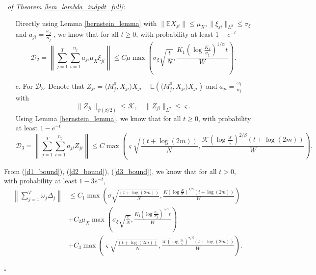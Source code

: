 \documentclass[12pt]{article}
\newenvironment{pf}{{\noindent\it Proof}\ }{\hfill $\square$\par}
\begin{document}
\begin{pf}{\it of Theorem \ref{lem_lambda_indpdt_full}:}
\begin{itemize}
  Directly using Lemma \ref{bernstein_lemma} with $\|\mathbb{E} X_{ji}\| \le  \mu_X,  \|\xi_{ji}\|_{L^2} \le \sigma_\xi$ and $a_{ji} = \frac{\omega_j}{n_j}$ , we know that for all $t\ge 0$, with probability at least $1-e^{-t}$
  \begin{equation}
  \label{d2_bound}
  \mathcal{D}_2 = \left\|\sum_{j=1}^T\sum_{i=1}^{n_j}a_{ji}\mu_X \xi_{ji}\right\| \le C \mu \max\left(\sigma_\xi \sqrt{\frac{t}{N}},\frac{K_1 (\log \frac{K_1}{\sigma_\xi})^{1/\alpha}t}{W}
  \right).
  \end{equation}
  \item[c.] For $\mathcal{D}_3$.
  Denote that $Z_{ji} = \langle M_j^0, X_{ji}\rangle X_{ji} - \mathbb{E}(\langle M^0_j, X_{ji}\rangle X_{ji})$ and $a_{ji} = \frac{\omega_j}{n_j}$ with 
  \begin{equation*}
 \|Z_{ji}\|_{\psi(\beta/2)} \le   \mathcal{K}, \quad \|Z_{ji}\|_{L^2} \le\varsigma .
  \end{equation*}
  Using Lemma \ref{bernstein_lemma}, we know that for all $t\ge0$, with probability at least $1-e^{-t}$
  \begin{equation}
  \label{d3_bound}
  \mathcal{D}_3 = \left\|\sum_{j=1}^T \sum_{i=1}^{n_j} a_{ji} Z_{ji}\right\| \le C\max\left(\varsigma \sqrt{\frac{(t+\log(2m))}{N}},\frac{\mathcal{K}\left(\log \frac{\mathcal{K}}{\varsigma}\right)^{2/\beta}(t + \log(2m))}{W}\right).
  \end{equation}
  \end{itemize}

  From (\ref{d1_bound}), (\ref{d2_bound}), (\ref{d3_bound}), we know that
  for all $t>0$, with probability at least $1-3e^{-t}$, 
  \begin{equation*}
  \begin{aligned}
  \left\|\sum_{j=1}^T \omega_j\Delta_j \right\| & \le C_1\max\left(\sigma \sqrt{\frac{(t+\log(2m))}{N}},\frac{K\left(\log \frac{K}{\sigma}\right)^{1/\gamma}(t + \log(2m))}{W}\right) \\&+ C_2\mu_X\max\left(\sigma_\xi \sqrt{\frac{t}{N}},\frac{K_1 (\log \frac{K_1}{\sigma_\xi})^{1/\alpha}t}{W}
  \right) \\&+ C_3\max\left(\varsigma \sqrt{\frac{(t+\log(2m))}{N}},\frac{\mathcal{K}\left(\log \frac{\mathcal{K}}{\varsigma}\right)^{2/\beta}(t + \log(2m))}{W}\right).
  \end{aligned}
  \end{equation*}
  
\end{pf}
\end{document}
